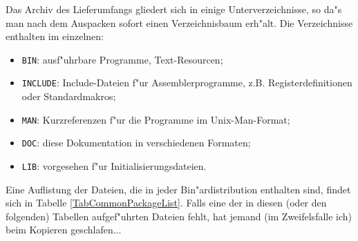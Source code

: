 \documentclass[12pt,a4paper,twoside]{report}
\begin{document}
Das Archiv des Lieferumfangs gliedert sich in einige Unterverzeichnisse,
so da"s man nach dem Auspacken sofort einen Verzeichnisbaum erh"alt.  Die
Verzeichnisse enthalten im einzelnen:
\begin{itemize}
\item{{\tt BIN}: ausf"uhrbare Programme, Text-Resourcen;}
\item{{\tt INCLUDE}: Include-Dateien f"ur Assemblerprogramme, z.B.
      Registerdefinitionen oder Standardmakros;}
\item{{\tt MAN}: Kurzreferenzen f"ur die Programme im Unix-Man-Format;}
\item{{\tt DOC}: diese Dokumentation in verschiedenen Formaten;}
\item{{\tt LIB}: vorgesehen f"ur Initialisierungsdateien.}
\end{itemize}
Eine Auflistung der Dateien, die in jeder Bin"ardistribution enthalten
sind, findet sich in Tabelle \ref{TabCommonPackageList}.  Falls eine der
in diesen (oder den folgenden) Tabellen aufgef"uhrten Dateien fehlt, hat
jemand (im Zweifelsfalle ich) beim Kopieren geschlafen...
\end{document}
